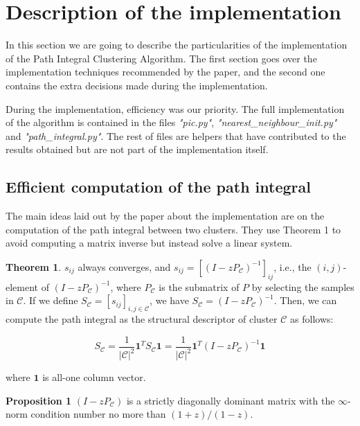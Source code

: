 \documentclass[
	10pt,
	parskip=half-,	
	paper=a4,
	english
	]{scrartcl}
\begin{document}
\newpage
\section {Description of the implementation}

In this section we are going to describe the particularities of the implementation of the Path Integral Clustering Algorithm. The first section goes over the implementation techniques recommended by the paper, and the second one contains the extra decisions made during the implementation. 

During the implementation, efficiency was our priority. The full implementation of the algorithm is contained in the files \textit{"pic.py"}, \textit{"nearest\_neighbour\_init.py"} and \textit{"path\_integral.py"}. The rest of files are helpers that have contributed to the results obtained but are not part of the implementation itself.

\subsection{Efficient computation of the path integral}

The main ideas laid out by the paper about the implementation are on the computation of the path integral between two clusters. They use Theorem 1 to avoid computing a matrix inverse but instead solve a linear system. 

\textbf{Theorem 1}. $s_{ij}$ always converges, and $s_{ij}= \left[(I - zP_{\mathcal{C}})^{-1}\right]_{ij}$, i.e., the $(i,j)$-element of $(I-zP_{\mathcal{C}})^{-1}$, where $P_{\mathcal{C}}$ is the submatrix of $P$ by selecting the samples in $\mathcal{C}$. If we define $S_{\mathcal{C}} = [s_{ij}]_{i,j \in \mathcal{C}}$, we have $S_{\mathcal{C}} = (I - zP_{\mathcal{C}})^{-1}$. Then, we can compute the path integral as the structural descriptor of cluster $\mathcal{C}$ as follows:

\begin{equation}
    S_{\mathcal{C}} = \frac{1}{|\mathcal{C}|^2} \mathbf{1}^{T} S_{\mathcal{C}} \mathbf{1}
    = \frac{1}{|\mathcal{C}|^2} \mathbf{1}^{T} (I - zP_{\mathcal{C}})^{-1} \mathbf{1}
    \label{eq8}
\end{equation}

where $\mathbf{1}$ is all-one column vector.

\textbf{Proposition 1} $(I - zP_{\mathcal{C}})$ is a strictly diagonally dominant matrix with the $\infty$-norm condition number no more than $(1+z)/(1-z)$.
\end{document}
